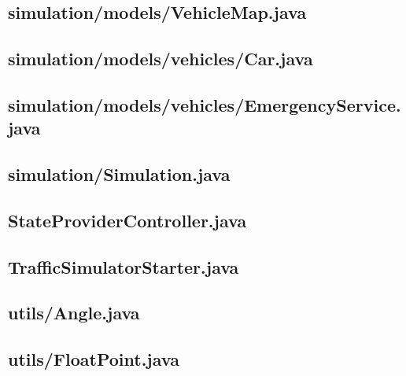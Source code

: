 \subsection{simulation/models/VehicleMap.java}

\newpage
\subsection{simulation/models/vehicles/Car.java}

\newpage
\subsection{simulation/models/vehicles/EmergencyService.java}

\newpage
\subsection{simulation/Simulation.java}

\newpage
\subsection{StateProviderController.java}

\newpage
\subsection{TrafficSimulatorStarter.java}

\newpage
\subsection{utils/Angle.java}

\newpage
\subsection{utils/FloatPoint.java}

\newpage
